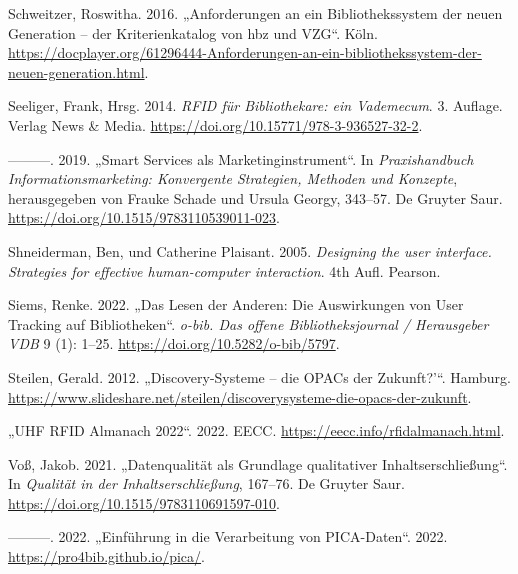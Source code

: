 \documentclass[
  11pt,
  letterpaper,
  DIV=11,
  twoside]{scrreprt}
\newlength{\cslhangindent}
\newenvironment{CSLReferences}[2] %
 {\begin{list}{}{%
  \setlength{\itemindent}{0pt}
  \setlength{\leftmargin}{0pt}
  \setlength{\parsep}{0pt}
  \ifodd #1
   \setlength{\leftmargin}{\cslhangindent}
   \setlength{\itemindent}{-1\cslhangindent}
  \fi
  \setlength{\itemsep}{#2\baselineskip}}}
 {\end{list}}
\begin{document}
\begin{CSLReferences}{1}{0}
Schweitzer, Roswitha. 2016. {„Anforderungen an ein Bibliothekssystem der
neuen Generation -- der Kriterienkatalog von hbz und {VZG}``}. Köln.
\url{https://docplayer.org/61296444-Anforderungen-an-ein-bibliothekssystem-der-neuen-generation.html}.

Seeliger, Frank, Hrsg. 2014. \emph{{RFID} für Bibliothekare: ein
Vademecum}. 3. Auflage. Verlag News \& Media.
\url{https://doi.org/10.15771/978-3-936527-32-2}.

---------. 2019. {„Smart Services als Marketinginstrument``}. In
\emph{Praxishandbuch Informationsmarketing: Konvergente Strategien,
Methoden und Konzepte}, herausgegeben von Frauke Schade und Ursula
Georgy, 343--57. De Gruyter Saur.
\url{https://doi.org/10.1515/9783110539011-023}.

Shneiderman, Ben, und Catherine Plaisant. 2005. \emph{Designing the user
interface. Strategies for effective human-computer interaction}. 4th
Aufl. Pearson.

Siems, Renke. 2022. {„Das Lesen der Anderen: Die Auswirkungen von User
Tracking auf Bibliotheken``}. \emph{o-bib. Das offene Bibliotheksjournal
/ Herausgeber {VDB}} 9 (1): 1--25.
\url{https://doi.org/10.5282/o-bib/5797}.

Steilen, Gerald. 2012. {„Discovery-Systeme -- die {OPACs} der
Zukunft?'``}. Hamburg.
\url{https://www.slideshare.net/steilen/discoverysysteme-die-opacs-der-zukunft}.

{„{UHF} {RFID} Almanach 2022``}. 2022. {EECC}.
\url{https://eecc.info/rfidalmanach.html}.

Voß, Jakob. 2021. {„Datenqualität als Grundlage qualitativer
Inhaltserschließung``}. In \emph{Qualität in der Inhaltserschließung},
167--76. De Gruyter Saur.
\url{https://doi.org/10.1515/9783110691597-010}.

---------. 2022. {„Einführung in die Verarbeitung von {PICA}-Daten``}.
2022. \url{https://pro4bib.github.io/pica/}.

\end{CSLReferences}

\cleardoublepage
{}
{}
\appendix
\end{document}
